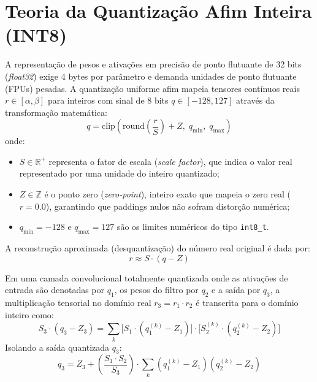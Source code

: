\section{Teoria da Quantização Afim Inteira (INT8)}
\label{sec:quantizacao_int8}

A representação de pesos e ativações em precisão de ponto flutuante de 32 bits (\textit{float32}) exige 4 bytes por parâmetro e demanda unidades de ponto flutuante (FPUs) pesadas. A quantização uniforme afim \cite{jacob2018quantization} mapeia tensores contínuos reais $r \in [\alpha, \beta]$ para inteiros com sinal de 8 bits $q \in [-128, 127]$ através da transformação matemática:
\begin{equation}
q = \text{clip}\left( \text{round}\left( \frac{r}{S} \right) + Z,\; q_{\min},\; q_{\max} \right)
\label{eq:quantizacao_direta}
\end{equation}
onde:
\begin{itemize}
    \item $S \in \mathbb{R}^+$ representa o fator de escala (\textit{scale factor}), que indica o valor real representado por uma unidade do inteiro quantizado;
    \item $Z \in \mathbb{Z}$ é o ponto zero (\textit{zero-point}), inteiro exato que mapeia o zero real ($r = 0.0$), garantindo que paddings nulos não sofram distorção numérica;
    \item $q_{\min} = -128$ e $q_{\max} = 127$ são os limites numéricos do tipo \texttt{int8\_t}.
\end{itemize}

A reconstrução aproximada (desquantização) do número real original é dada por:
\begin{equation}
r \approx S \cdot (q - Z)
\label{eq:desquantizacao}
\end{equation}

Em uma camada convolucional totalmente quantizada onde as ativações de entrada são denotadas por $q_1$, os pesos do filtro por $q_2$ e a saída por $q_3$, a multiplicação tensorial no domínio real $r_3 = r_1 \cdot r_2$ é transcrita para o domínio inteiro como:
\begin{equation}
S_3 \cdot (q_3 - Z_3) = \sum_{k} \Big[ S_1 \cdot (q_1^{(k)} - Z_1) \Big] \cdot \Big[ S_2^{(k)} \cdot (q_2^{(k)} - Z_2) \Big]
\end{equation}
Isolando a saída quantizada $q_3$:
\begin{equation}
q_3 = Z_3 + \left( \frac{S_1 \cdot S_2}{S_3} \right) \cdot \sum_{k} (q_1^{(k)} - Z_1)(q_2^{(k)} - Z_2)
\label{eq:matriz_quantizada}
\end{equation}

